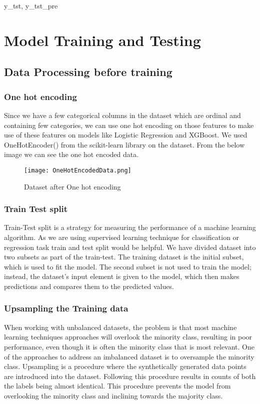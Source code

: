 y_tst, y_tst_pre\documentclass[12pt]{article}
\begin{document}
\section{Model Training and Testing}

\subsection{Data Processing before training}
\subsubsection{One hot encoding}
Since we have a few categorical columns in the dataset which are ordinal and containing few categories, we can use one hot encoding on those features to make use of these features on models like Logistic Regression and XGBoost. We used OneHotEncoder() from the scikit-learn library on the dataset. From the below image we can see the one hot encoded data.
\begin{figure}[h] %
\centering
\texttt{[image: OneHotEncodedData.png]}
\caption{Dataset after One hot encoding}
\end{figure}

\subsubsection{Train Test split}
Train-Test split is a strategy for measuring the performance of a machine learning algorithm. As we are using supervised learning technique for classification or regression task train and test split would be helpful.
We have divided dataset into two subsets as part of the train-test. The training dataset is the initial subset, which is used to fit the model. The second subset is not used to train the model; instead, the dataset's input element is given to the model, which then makes predictions and compares them to the predicted values.

\subsubsection{Upsampling the Training data}
When working with unbalanced datasets, the problem is that most machine learning techniques approaches will overlook the minority class, resulting in poor performance, even though it is often the minority class that is most relevant. One of the approaches to address an imbalanced dataset is to oversample the minority class.
Upsampling is a procedure where the synthetically generated data points are introduced into the dataset. Following this procedure results in counts of both the labels being almost identical. This procedure prevents the model from overlooking the minority class and inclining towards the majority class.
\end{document}
